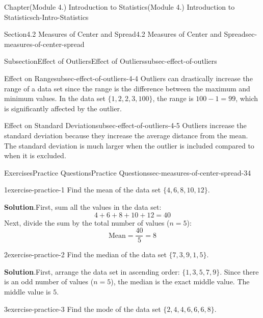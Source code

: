 \documentclass[oneside,10pt,]{book}
\newcommand{\blocktitlefont}{\relax}
\begin{document}
\begin{chapterptx}{Chapter}{(Module 4.) Introduction to Statistics}{}{(Module 4.) Introduction to Statistics}{}{}{ch-Intro-Statistics}
\begin{sectionptx}{Section}{4.2 Measures of Center and Spread}{}{4.2 Measures of Center and Spread}{}{}{sec-measures-of-center-spread}
\begin{subsectionptx}{Subsection}{Effect of Outliers}{}{Effect of Outliers}{}{}{subsec-effect-of-outliers}
\begin{descriptionlist}
\begin{dlimedium}{Effect on Range}{subsec-effect-of-outliers-4-4}
Outliers can drastically increase the range of a data set since the range is the difference between the maximum and minimum values. In the data set \(\{1, 2, 2, 3, 100\}\), the range is \(100 - 1 = 99\), which is significantly affected by the outlier.%
\end{dlimedium}%
\begin{dlimedium}{Effect on Standard Deviation}{subsec-effect-of-outliers-4-5}%
Outliers increase the standard deviation because they increase the average distance from the mean. The standard deviation is much larger when the outlier is included compared to when it is excluded.%
\end{dlimedium}%
\end{descriptionlist}
\end{subsectionptx}
%
%
\typeout{************************************************}
\typeout{************************************************}
%
\begin{exercises-subsection}{Exercises}{Practice Questions}{}{Practice Questions}{}{}{sec-measures-of-center-spread-34}
\begin{divisionexercise}{1}{}{}{exercise-practice-1}%
Find the mean of the data set \(\{4, 6, 8, 10, 12\}\).%
\par\smallskip%
\noindent\textbf{\blocktitlefont Solution}.\hypertarget{exercise-practice-1-2}{}\quad{}First, sum all the values in the data set:%
\begin{equation*}
4 + 6 + 8 + 10 + 12 = 40
\end{equation*}
Next, divide the sum by the total number of values (\(n = 5\)):%
\begin{equation*}
\text{Mean} = \frac{40}{5} = 8
\end{equation*}
%
\end{divisionexercise}%
\begin{divisionexercise}{2}{}{}{exercise-practice-2}%
Find the median of the data set \(\{7, 3, 9, 1, 5\}\).%
\par\smallskip%
\noindent\textbf{\blocktitlefont Solution}.\hypertarget{exercise-practice-2-2}{}\quad{}First, arrange the data set in ascending order: \(\{1, 3, 5, 7, 9\}\). Since there is an odd number of values (\(n = 5\)), the median is the exact middle value. The middle value is \(5\).%
\end{divisionexercise}%
\begin{divisionexercise}{3}{}{}{exercise-practice-3}%
Find the mode of the data set \(\{2, 4, 4, 6, 6, 6, 8\}\).%
\par\smallskip%

\end{divisionexercise}
\end{exercises-subsection}
\end{sectionptx}
\end{chapterptx}
\end{document}
